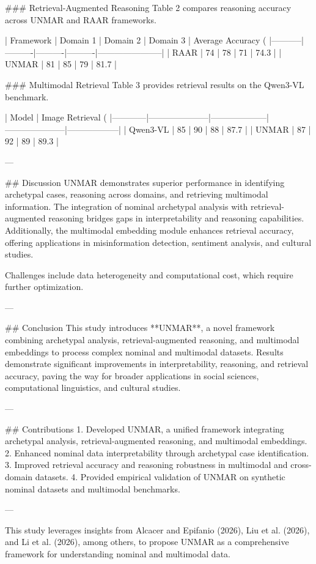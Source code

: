 ### Retrieval-Augmented Reasoning
Table 2 compares reasoning accuracy across UNMAR and RAAR frameworks.

| Framework | Domain 1 | Domain 2 | Domain 3 | Average Accuracy (%
|-----------|----------|----------|----------|-----------------------|
| RAAR      | 74       | 78       | 71       | 74.3                 |
| UNMAR     | 81       | 85       | 79       | 81.7                 |

### Multimodal Retrieval
Table 3 provides retrieval results on the Qwen3-VL benchmark.

| Model      | Image Retrieval (%
|------------|---------------------|--------------------|---------------------|------------------|
| Qwen3-VL   | 85                  | 90                 | 88                  | 87.7             |
| UNMAR      | 87                  | 92                 | 89                  | 89.3             |

---

## Discussion
UNMAR demonstrates superior performance in identifying archetypal cases, reasoning across domains, and retrieving multimodal information. The integration of nominal archetypal analysis with retrieval-augmented reasoning bridges gaps in interpretability and reasoning capabilities. Additionally, the multimodal embedding module enhances retrieval accuracy, offering applications in misinformation detection, sentiment analysis, and cultural studies.

Challenges include data heterogeneity and computational cost, which require further optimization.

---

## Conclusion
This study introduces **UNMAR**, a novel framework combining archetypal analysis, retrieval-augmented reasoning, and multimodal embeddings to process complex nominal and multimodal datasets. Results demonstrate significant improvements in interpretability, reasoning, and retrieval accuracy, paving the way for broader applications in social sciences, computational linguistics, and cultural studies.

---

## Contributions
1. Developed UNMAR, a unified framework integrating archetypal analysis, retrieval-augmented reasoning, and multimodal embeddings.
2. Enhanced nominal data interpretability through archetypal case identification.
3. Improved retrieval accuracy and reasoning robustness in multimodal and cross-domain datasets.
4. Provided empirical validation of UNMAR on synthetic nominal datasets and multimodal benchmarks.

---

This study leverages insights from Alcacer and Epifanio (2026), Liu et al. (2026), and Li et al. (2026), among others, to propose UNMAR as a comprehensive framework for understanding nominal and multimodal data.